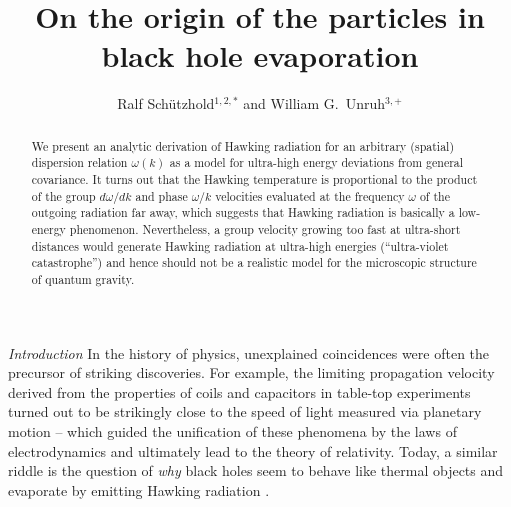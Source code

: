 \documentclass[aps,prl,showpacs,amssymb,nofootinbib,twocolumn]{revtex4}
\begin{document}
\title{On the origin of the particles in black hole evaporation} 

\author{Ralf Sch\"utzhold$^{1,2,*}$ and William G.~Unruh$^{3,+}$}


\begin{abstract}
We present an analytic derivation of Hawking radiation for an
arbitrary (spatial) dispersion relation $\omega(k)$ as a model for
ultra-high energy deviations from general covariance. 
%
It turns out that the Hawking temperature is proportional to the
product of the group $d\omega/dk$ and phase $\omega/k$ velocities
evaluated at the frequency $\omega$ of the outgoing radiation far
away, which suggests that Hawking radiation is basically a low-energy
phenomenon. 
%
Nevertheless, a group velocity growing too fast at ultra-short
distances would generate Hawking radiation at ultra-high energies
(``ultra-violet catastrophe'') and hence should not be a realistic
model for the microscopic structure of quantum gravity.  
\end{abstract}

 
\maketitle

{\em Introduction}\quad
%
In the history of physics, unexplained coincidences were often the 
precursor of striking discoveries.
%
For example, the limiting propagation velocity derived from the
properties of coils and capacitors in table-top experiments turned out
to be strikingly close to the speed of light measured via planetary
motion -- which guided the unification of these phenomena by the laws
of electrodynamics and ultimately lead to the theory of relativity. 
%
Today, a similar riddle is the question of {\em why} black holes seem 
to behave like thermal objects \cite{thermo} and evaporate by emitting
Hawking radiation \cite{hawking,unruh,point}.  
\end{document}
